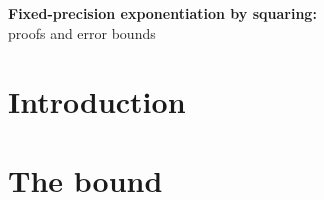 \documentclass[a4paper,10pt]{article}
\begin{document}
\begin{center}{\LARGE\bf
    Fixed-precision exponentiation by squaring:} \\
  proofs and error bounds
 
\end{center}

\section{Introduction}

\section{The bound}
\end{document}
